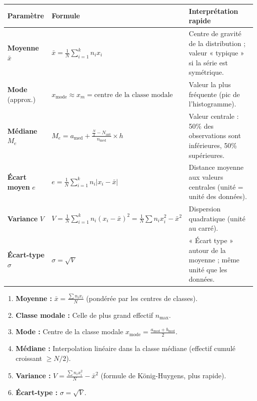 \documentclass[11pt]{article}
\begin{document}
\begin{aretenir}
\begin{center}
\begin{tabularx}{\linewidth}{|l|X|X|}\hline
\textbf{Paramètre} & \textbf{Formule} & \textbf{Interprétation rapide} \\ \hline
\rowcolor{popblueL}
\textbf{Moyenne} $\bar{x}$ & $\bar{x} = \frac{1}{N}\sum_{i=1}^k n_i x_i$ & Centre de gravité de la distribution ; valeur « typique » si la série est symétrique. \\ \hline
\textbf{Mode} (approx.) & $x_{\text{mode}} \approx x_{m} = \text{centre de la classe modale}$ & Valeur la plus fréquente (pic de l'histogramme). \\ \hline
\textbf{Médiane} $M_e$ & $M_e = a_{\text{med}} + \frac{\frac{N}{2} - N_{\text{ant}}}{n_{\text{med}}} \times h$ & Valeur centrale : 50\% des observations sont inférieures, 50\% supérieures. \\ \hline
\rowcolor{poporangeL}
\textbf{Écart moyen} $e$ & $e = \frac{1}{N}\sum_{i=1}^k n_i |x_i - \bar{x}|$ & Distance moyenne aux valeurs centrales (unité = unité des données). \\ \hline
\textbf{Variance} $V$ & $V = \frac{1}{N}\sum_{i=1}^k n_i (x_i - \bar{x})^2 = \frac{1}{N}\sum n_i x_i^2 - \bar{x}^2$ & Dispersion quadratique (unité au carré). \\ \hline
\textbf{Écart-type} $\sigma$ & $\sigma = \sqrt{V}$ & « Écart type » autour de la moyenne ; même unité que les données. \\ \hline
\end{tabularx}
\end{center}
\end{aretenir}

\begin{methode}
\begin{enumerate}
    \item \textbf{Moyenne :} $\bar{x} = \frac{\sum n_i x_i}{N}$ (pondérée par les centres de classes).
    \item \textbf{Classe modale :} Celle de plus grand effectif $n_{\max}$.
    \item \textbf{Mode :} Centre de la classe modale $x_{\text{mode}} = \frac{a_{\text{mod}}+b_{\text{mod}}}{2}$.
    \item \textbf{Médiane :} Interpolation linéaire dans la classe médiane (effectif cumulé croissant $\ge N/2$).
    \item \textbf{Variance :} $V = \frac{\sum n_i x_i^2}{N} - \bar{x}^2$ (formule de König-Huygens, plus rapide).
    \item \textbf{Écart-type :} $\sigma = \sqrt{V}$.
\end{enumerate}
\end{methode}
\end{document}
